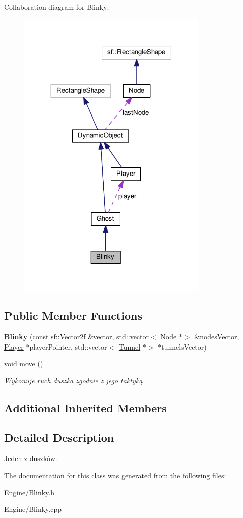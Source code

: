 Collaboration diagram for Blinky\+:\nopagebreak
\begin{figure}[H]
\begin{center}
\leavevmode
\includegraphics[width=259pt]{classBlinky__coll__graph}
\end{center}
\end{figure}
\subsection*{Public Member Functions}
\begin{DoxyCompactItemize}
\item 
\mbox{\label{classBlinky_a1dc22a209b4074b5141e472a16479d68}} 
{\bfseries Blinky} (const sf\+::\+Vector2f \&vector, std\+::vector$<$ \hyperlink{classNode}{Node} $\ast$$>$ \&nodes\+Vector, \hyperlink{classPlayer}{Player} $\ast$player\+Pointer, std\+::vector$<$ \hyperlink{classTunnel}{Tunnel} $\ast$$>$ $\ast$tunnels\+Vector)
\item 
\mbox{\label{classBlinky_a801c3ec6c0132364748089029499def9}} 
void \hyperlink{classBlinky_a801c3ec6c0132364748089029499def9}{move} ()
\begin{DoxyCompactList}\small\item\em Wykonuje ruch duszka zgodnie z jego taktyką \end{DoxyCompactList}\end{DoxyCompactItemize}
\subsection*{Additional Inherited Members}


\subsection{Detailed Description}
Jeden z duszków. 

The documentation for this class was generated from the following files\+:\begin{DoxyCompactItemize}
\item 
Engine/Blinky.\+h\item 
Engine/Blinky.\+cpp\end{DoxyCompactItemize}
